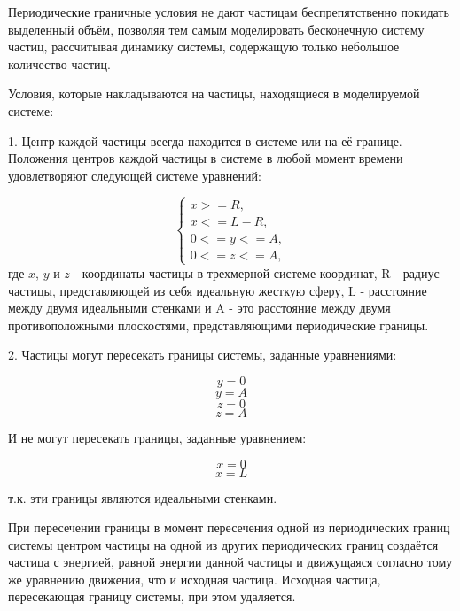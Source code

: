 \documentclass[a4paper]{article}
\begin{document}
Периодические граничные условия не дают частицам беспрепятственно покидать выделенный объём, позволяя тем самым моделировать бесконечную систему частиц, рассчитывая динамику системы, содержащую только небольшое количество частиц.

Условия, которые накладываются на частицы, находящиеся в моделируемой системе:

1. Центр каждой частицы всегда находится в системе или на её границе. Положения центров каждой частицы в системе в любой момент времени удовлетворяют следующей системе уравнений:

\begin{equation}
    \begin{cases}
        x >= R,
        \\
        x <= L - R,
        \\
        0 <= y <= A,
        \\
        0 <= z <= A,
    \end{cases}
\end{equation}
где $ x $, $ y $ и $ z $ - координаты частицы в трехмерной системе координат, R - радиус частицы, представляющей из себя идеальную жесткую сферу, L - расстояние между двумя идеальными стенками и A - это расстояние между двумя противоположными плоскостями, представляющими периодические границы.

2. Частицы могут пересекать границы системы, заданные уравнениями:

\begin{equation}
y = 0
\end{equation}
\begin{equation}
y = A
\end{equation}
\begin{equation}
z = 0
\end{equation}
\begin{equation}
z = A
\end{equation}

И не могут пересекать границы, заданные уравнением:

\begin{equation}
x = 0
\end{equation}
\begin{equation}
x = L
\end{equation}

т.к. эти границы являются идеальными стенками. 

При пересечении границы в момент пересечения одной из периодических границ системы центром частицы на одной из других периодических границ создаётся частица с энергией, равной энергии данной частицы и движущаяся согласно тому же уравнению движения, что и исходная частица. Исходная частица, пересекающая границу системы, при этом удаляется.
\end{document}
